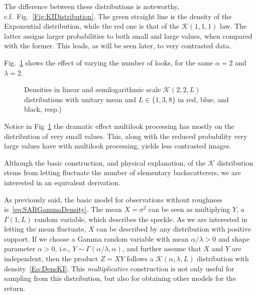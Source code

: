 The difference between these distributions is noteworthy, c.f.\ Fig.~\ref{Fig:KIDistribution}.
The green straight line is the density of the Exponential distribution, while the red one is that of the $\mathcal K(1,1,1)$ law.
The latter assigns larger probabilities to both small and large values, when compared with the former.
This leads, as will be seen later, to very contrasted data.

Fig.~\ref{Fig:KIDistributionLooks} shows the effect of varying the number of looks, for the same $\alpha=2$ and $\lambda=2$.

\begin{figure}[hbt]
\centering
{}
\caption[Densities in linear and semilogarithmic scale $\mathcal K(2,2,L)$ distributions with unitary mean and $L\in\{1,3,8\}$]{Densities in linear and semilogarithmic scale $\mathcal K(2,2,L)$ distributions with unitary mean and $L\in\{1,3,8\}$ in red, blue, and black, resp.)}\label{Fig:KIDistributionLooks}
\end{figure}

Notice in Fig~\ref{Fig:KIDistributionLooks} the dramatic effect multilook processing has mostly on the distribution of very small values.
This, along with the reduced probability very large values have with multilook processing, yields less contrasted images.

Although the basic construction, and physical explanation, of the $\mathcal K$ distribution stems from letting fluctuate the number of elementary backscatterers, we are interested in an equivalent derivation.

As previously said, the basic model for observations without roughness is~\eqref{eq:SARGammaDensity}.
The mean $X=\sigma^2$ can be seen as multiplying $Y$, a $\Gamma(1,L)$ random variable, which describes the speckle.
As we are interested in letting the mean fluctuate, $X$ can be described by any distribution with positive support.
If we choose a Gamma random variable with mean $\alpha/\lambda>0$ and shape parameter $\alpha>0$, i.e., $Y\sim\Gamma(\alpha/\lambda,\alpha)$, and further assume that $X$ and $Y$ are independent, then the product $Z=XY$ follows a $\mathcal{K}(\alpha,\lambda,L)$ distribution with density~\eqref{Eq:DensKI}.
This \textit{multiplicative} construction is not only useful for sampling from this distribution, but also for obtaining other models for the return.

